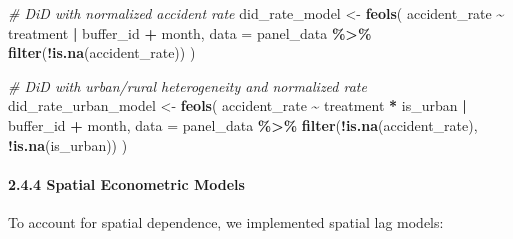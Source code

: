 \documentclass[
]{article}
\newenvironment{Shaded}{\begin{snugshade}}{\end{snugshade}}
\newcommand{\AttributeTok}[1]{\textcolor[rgb]{0.13,0.29,0.53}{#1}}
\newcommand{\CommentTok}[1]{\textcolor[rgb]{0.56,0.35,0.01}{\textit{#1}}}
\newcommand{\FunctionTok}[1]{\textcolor[rgb]{0.13,0.29,0.53}{\textbf{#1}}}
\newcommand{\NormalTok}[1]{#1}
\newcommand{\OtherTok}[1]{\textcolor[rgb]{0.56,0.35,0.01}{#1}}
\newcommand{\SpecialCharTok}[1]{\textcolor[rgb]{0.81,0.36,0.00}{\textbf{#1}}}
\begin{document}
\begin{Shaded}
\begin{Highlighting}[]
\CommentTok{\# DiD with normalized accident rate}
\NormalTok{did\_rate\_model }\OtherTok{\textless{}{-}} \FunctionTok{feols}\NormalTok{(}
\NormalTok{  accident\_rate }\SpecialCharTok{\textasciitilde{}}\NormalTok{ treatment }\SpecialCharTok{|}\NormalTok{ buffer\_id }\SpecialCharTok{+}\NormalTok{ month,}
  \AttributeTok{data =}\NormalTok{ panel\_data }\SpecialCharTok{\%\textgreater{}\%} \FunctionTok{filter}\NormalTok{(}\SpecialCharTok{!}\FunctionTok{is.na}\NormalTok{(accident\_rate))}
\NormalTok{)}

\CommentTok{\# DiD with urban/rural heterogeneity and normalized rate}
\NormalTok{did\_rate\_urban\_model }\OtherTok{\textless{}{-}} \FunctionTok{feols}\NormalTok{(}
\NormalTok{  accident\_rate }\SpecialCharTok{\textasciitilde{}}\NormalTok{ treatment }\SpecialCharTok{*}\NormalTok{ is\_urban }\SpecialCharTok{|}\NormalTok{ buffer\_id }\SpecialCharTok{+}\NormalTok{ month,}
  \AttributeTok{data =}\NormalTok{ panel\_data }\SpecialCharTok{\%\textgreater{}\%} \FunctionTok{filter}\NormalTok{(}\SpecialCharTok{!}\FunctionTok{is.na}\NormalTok{(accident\_rate), }\SpecialCharTok{!}\FunctionTok{is.na}\NormalTok{(is\_urban))}
\NormalTok{)}
\end{Highlighting}
\end{Shaded}

\paragraph{2.4.4 Spatial Econometric
Models}\label{spatial-econometric-models}

To account for spatial dependence, we implemented spatial lag models:
\end{document}

